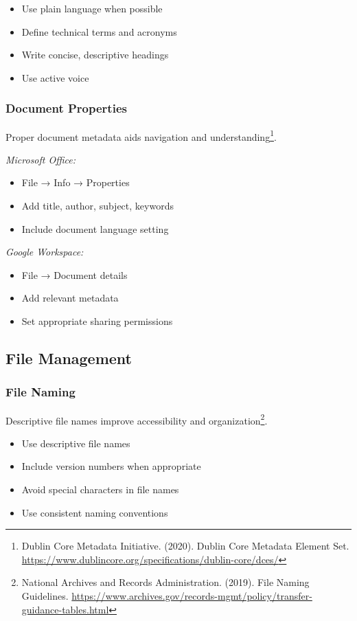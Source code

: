 \begin{itemize}
\item Use plain language when possible
\item Define technical terms and acronyms
\item Write concise, descriptive headings
\item Use active voice
\end{itemize}

\subsubsection{Document Properties}
Proper document metadata aids navigation and understanding\footnote{Dublin Core Metadata Initiative. (2020). Dublin Core Metadata Element Set. \url{https://www.dublincore.org/specifications/dublin-core/dces/}}.

\emph{Microsoft Office:}
\begin{itemize}
\item File → Info → Properties
\item Add title, author, subject, keywords
\item Include document language setting
\end{itemize}

\emph{Google Workspace:}
\begin{itemize}
\item File → Document details
\item Add relevant metadata
\item Set appropriate sharing permissions
\end{itemize}

\subsection{File Management}

\subsubsection{File Naming}
Descriptive file names improve accessibility and organization\footnote{National Archives and Records Administration. (2019). File Naming Guidelines. \url{https://www.archives.gov/records-mgmt/policy/transfer-guidance-tables.html}}.

\begin{itemize}
\item Use descriptive file names
\item Include version numbers when appropriate
\item Avoid special characters in file names
\item Use consistent naming conventions
\end{itemize}

